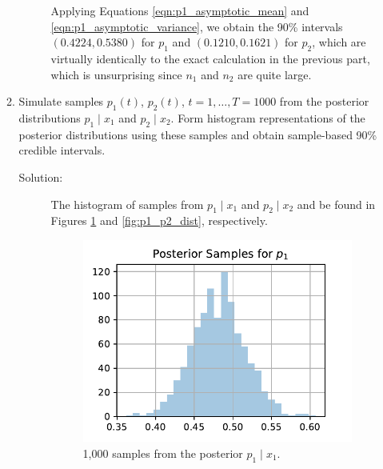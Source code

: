 \documentclass[letterpaper,11pt]{article}
\begin{document}
\begin{enumerate}
\begin{enumerate}
\begin{description}
      Applying Equations \ref{eqn:p1_asymptotic_mean} and
      \ref{eqn:p1_asymptotic_variance}, we obtain the 90\% intervals
      $(0.4224, 0.5380)$ for $p_1$ and $(0.1210, 0.1621)$ for $p_2$, which are
      virtually identically to the exact calculation in the previous part, which
      is unsurprising since $n_1$ and $n_2$ are quite large.      
    \end{description}
  \item Simulate samples $p_1(t)$, $p_2(t)$, $t = 1, \ldots, T = 1000$ from the
    posterior distributions $p_1 \mid x_1$ and $p_2 \mid x_2$. Form histogram
    representations of the posterior distributions using these samples and
    obtain sample-based 90\% credible intervals.

    \begin{description}
    \item[Solution:] The histogram of samples from $p_1 \mid x_1$ and
      $p_2 \mid x_2$ and be found in Figures \ref{fig:p1_p1_dist} and
      \ref{fig:p1_p2_dist}, respectively.

      \begin{figure}        
        \centering
        \includegraphics{p1_p1.pdf}
        \caption{1,000 samples from the posterior $p_1 \mid x_1$.}
        \label{fig:p1_p1_dist}
      \end{figure}


\end{description}
\end{enumerate}
\end{enumerate}
\end{document}

